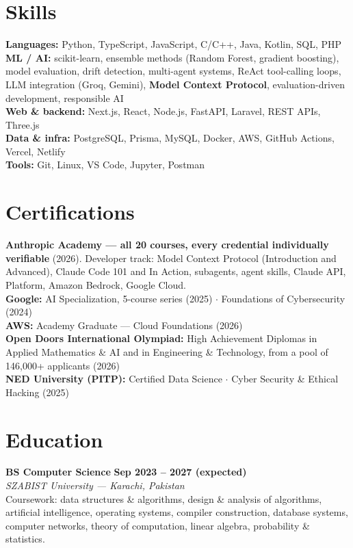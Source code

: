 \documentclass[a4paper,10pt]{article}
\newcommand{\role}[4]{%
  \textbf{#1} \hfill \textbf{#3}\\
  \textit{#2} \hfill \textit{#4}\\[0.2em]
}
\begin{document}
\section{Skills}
\textbf{Languages:} Python, TypeScript, JavaScript, C/C++, Java, Kotlin, SQL, PHP \\
\textbf{ML / AI:} scikit-learn, ensemble methods (Random Forest, gradient boosting), model
evaluation, drift detection, multi-agent systems, ReAct tool-calling loops, LLM integration
(Groq, Gemini), \textbf{Model Context Protocol}, evaluation-driven development, responsible AI \\
\textbf{Web \& backend:} Next.js, React, Node.js, FastAPI, Laravel, REST APIs, Three.js \\
\textbf{Data \& infra:} PostgreSQL, Prisma, MySQL, Docker, AWS, GitHub Actions, Vercel, Netlify \\
\textbf{Tools:} Git, Linux, VS Code, Jupyter, Postman

\section{Certifications}
\textbf{Anthropic Academy --- all 20 courses, every credential individually verifiable} (2026).
Developer track: Model Context Protocol (Introduction and Advanced), Claude Code 101 and In Action,
subagents, agent skills, Claude API, Platform, Amazon Bedrock, Google Cloud. \\
\textbf{Google:} AI Specialization, 5-course series (2025) $\cdot$ Foundations of Cybersecurity (2024) \\
\textbf{AWS:} Academy Graduate --- Cloud Foundations (2026) \\
\textbf{Open Doors International Olympiad:} High Achievement Diplomas in Applied Mathematics \& AI
and in Engineering \& Technology, from a pool of 146,000+ applicants (2026) \\
\textbf{NED University (PITP):} Certified Data Science $\cdot$ Cyber Security \& Ethical Hacking (2025)

\section{Education}
\role{BS Computer Science}{SZABIST University --- Karachi, Pakistan}{Sep 2023 -- 2027 (expected)}{}
\vspace{-0.6em}
Coursework: data structures \& algorithms, design \& analysis of algorithms, artificial intelligence,
operating systems, compiler construction, database systems, computer networks, theory of computation,
linear algebra, probability \& statistics.
\end{document}
